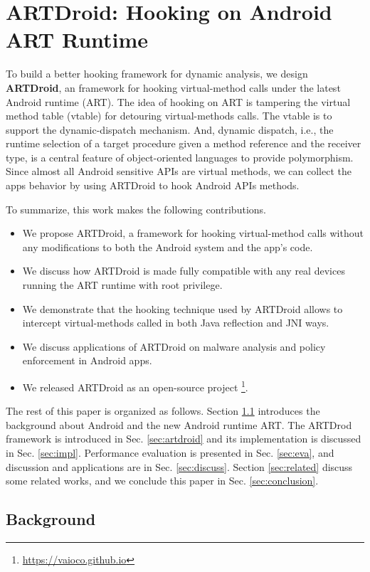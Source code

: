 \chapter{ARTDroid: Hooking on Android ART Runtime}

To build a better hooking framework for dynamic analysis, we design \textbf{ARTDroid}, an framework for hooking virtual-method calls under the latest Android runtime (ART). The idea of hooking on ART is tampering the virtual method table (vtable) for detouring virtual-methods calls. The vtable is to support the dynamic-dispatch mechanism. And, dynamic dispatch, i.e., the runtime selection of a target procedure given a method reference and the receiver type, is a central feature of object-oriented languages to provide polymorphism. Since almost all Android sensitive APIs are virtual methods, we can collect the apps behavior by using ARTDroid to hook Android APIs methods.


To summarize, this work makes the following contributions.

\begin{itemize}
\item We propose ARTDroid, a framework for hooking virtual-method calls without any modifications to both the Android system and the app's code.
\item We discuss how ARTDroid is made fully compatible with any real devices running the ART runtime with root privilege.
\item We demonstrate that the hooking technique used by ARTDroid allows to intercept virtual-methods called in both Java reflection and JNI ways.
\item We discuss applications of ARTDroid on malware analysis and policy enforcement in Android apps.
\item We released ARTDroid as an open-source project \footnote{\url{https://vaioco.github.io}}. 
\end{itemize}

The rest of this paper is organized as follows. Section \ref{sec:backg} introduces the background about Android and the new Android runtime ART. The ARTDrod framework is introduced in Sec. \ref{sec:artdroid} and its implementation is discussed in Sec. \ref{sec:impl}. Performance evaluation is presented in Sec. \ref{sec:eva}, and discussion and applications are in Sec. \ref{sec:discuss}. Section \ref{sec:related} discuss some related works, and we conclude this paper in Sec. \ref{sec:conclusion}.

\section{Background}
\label{sec:backg}

